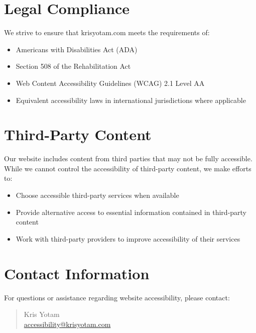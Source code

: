 \documentclass[11pt]{article}
\begin{document}
\section{Legal Compliance}

We strive to ensure that krisyotam.com meets the requirements of:

\begin{itemize}
  \item Americans with Disabilities Act (ADA)
  \item Section 508 of the Rehabilitation Act
  \item Web Content Accessibility Guidelines (WCAG) 2.1 Level AA
  \item Equivalent accessibility laws in international jurisdictions where applicable
\end{itemize}

\section{Third-Party Content}

Our website includes content from third parties that may not be fully accessible. While we cannot control the accessibility of third-party content, we make efforts to:

\begin{itemize}
  \item Choose accessible third-party services when available
  \item Provide alternative access to essential information contained in third-party content
  \item Work with third-party providers to improve accessibility of their services
\end{itemize}

\section{Contact Information}

For questions or assistance regarding website accessibility, please contact:

\begin{quote}
  Kris Yotam\\
  \href{mailto:accessibility@krisyotam.com}{accessibility@krisyotam.com}
\end{quote}
\end{document}
